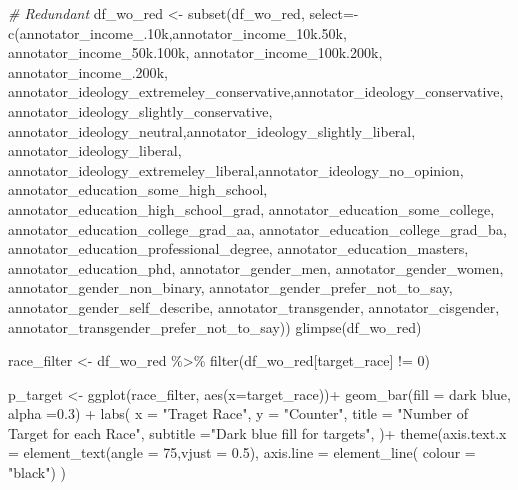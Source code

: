\documentclass[
]{article}
\newenvironment{Shaded}{\begin{snugshade}}{\end{snugshade}}
\newcommand{\AttributeTok}[1]{\textcolor[rgb]{0.77,0.63,0.00}{#1}}
\newcommand{\CommentTok}[1]{\textcolor[rgb]{0.56,0.35,0.01}{\textit{#1}}}
\newcommand{\DecValTok}[1]{\textcolor[rgb]{0.00,0.00,0.81}{#1}}
\newcommand{\FloatTok}[1]{\textcolor[rgb]{0.00,0.00,0.81}{#1}}
\newcommand{\FunctionTok}[1]{\textcolor[rgb]{0.00,0.00,0.00}{#1}}
\newcommand{\NormalTok}[1]{#1}
\newcommand{\OtherTok}[1]{\textcolor[rgb]{0.56,0.35,0.01}{#1}}
\newcommand{\SpecialCharTok}[1]{\textcolor[rgb]{0.00,0.00,0.00}{#1}}
\newcommand{\StringTok}[1]{\textcolor[rgb]{0.31,0.60,0.02}{#1}}
\begin{document}
\begin{Shaded}
\begin{Highlighting}[]
\CommentTok{\# Redundant}
\NormalTok{df\_wo\_red }\OtherTok{\textless{}{-}} \FunctionTok{subset}\NormalTok{(df\_wo\_red, }\AttributeTok{select=}\SpecialCharTok{{-}}\FunctionTok{c}\NormalTok{(annotator\_income\_}\FloatTok{.10}\NormalTok{k,annotator\_income\_10k}\FloatTok{.50}\NormalTok{k, annotator\_income\_50k}\FloatTok{.100}\NormalTok{k, annotator\_income\_100k}\FloatTok{.200}\NormalTok{k,}
\NormalTok{annotator\_income\_}\FloatTok{.200}\NormalTok{k, annotator\_ideology\_extremeley\_conservative,annotator\_ideology\_conservative,}
\NormalTok{annotator\_ideology\_slightly\_conservative, annotator\_ideology\_neutral,annotator\_ideology\_slightly\_liberal,}
\NormalTok{annotator\_ideology\_liberal, annotator\_ideology\_extremeley\_liberal,annotator\_ideology\_no\_opinion, annotator\_education\_some\_high\_school,}
\NormalTok{annotator\_education\_high\_school\_grad, annotator\_education\_some\_college, annotator\_education\_college\_grad\_aa, annotator\_education\_college\_grad\_ba,}
\NormalTok{annotator\_education\_professional\_degree, annotator\_education\_masters, annotator\_education\_phd, annotator\_gender\_men, annotator\_gender\_women, annotator\_gender\_non\_binary, annotator\_gender\_prefer\_not\_to\_say, annotator\_gender\_self\_describe, annotator\_transgender, annotator\_cisgender, annotator\_transgender\_prefer\_not\_to\_say))}
\FunctionTok{glimpse}\NormalTok{(df\_wo\_red)}

\NormalTok{race\_filter }\OtherTok{\textless{}{-}}\NormalTok{ df\_wo\_red }\SpecialCharTok{\%\textgreater{}\%} \FunctionTok{filter}\NormalTok{(df\_wo\_red[}\StringTok{\textquotesingle{}target\_race\textquotesingle{}}\NormalTok{] }\SpecialCharTok{!=} \DecValTok{0}\NormalTok{)}

\NormalTok{p\_target }\OtherTok{\textless{}{-}} \FunctionTok{ggplot}\NormalTok{(race\_filter, }\FunctionTok{aes}\NormalTok{(}\AttributeTok{x=}\NormalTok{target\_race))}\SpecialCharTok{+}
  \FunctionTok{geom\_bar}\NormalTok{(}\AttributeTok{fill =} \StringTok{\textquotesingle{}dark blue\textquotesingle{}}\NormalTok{, }\AttributeTok{alpha =}\FloatTok{0.3}\NormalTok{) }\SpecialCharTok{+}
  \FunctionTok{labs}\NormalTok{(}
    \AttributeTok{x =} \StringTok{"Traget Race"}\NormalTok{,}
    \AttributeTok{y =} \StringTok{"Counter"}\NormalTok{,}
    \AttributeTok{title =} \StringTok{"Number of Target for each Race"}\NormalTok{,}
    \AttributeTok{subtitle =}\StringTok{"Dark blue fill for targets"}\NormalTok{,}
\NormalTok{  )}\SpecialCharTok{+}
  \FunctionTok{theme}\NormalTok{(}\AttributeTok{axis.text.x =} \FunctionTok{element\_text}\NormalTok{(}\AttributeTok{angle =} \DecValTok{75}\NormalTok{,}\AttributeTok{vjust =} \FloatTok{0.5}\NormalTok{),}
        \AttributeTok{axis.line =} \FunctionTok{element\_line}\NormalTok{( }\AttributeTok{colour =} \StringTok{"black"}\NormalTok{)}
\NormalTok{  )}


\end{Highlighting}
\end{Shaded}
\end{document}
